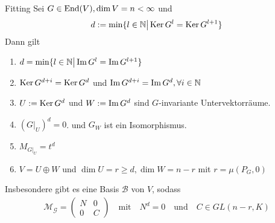 

\begin{lemma}{Fitting}
    Sei $G \in \operatorname{End}(V), \dim V = n < \infty$ und 
    \begin{align*}
        d: = \min\{l \in \mathbb{N} \big\vert \operatorname{Ker} G^l = \operatorname{Ker} G^{l+1}\}
    \end{align*}
    Dann gilt
    \begin{enumerate}
        \item   $d = \min \{l \in \mathbb{N} \big\vert \operatorname{Im} G^l = \operatorname{Im} G^{l+1}\}$
        \item   $\operatorname{Ker} G^{d+i} = \operatorname{Ker} G^d$ und $\operatorname{Im} G^{d+i} = \operatorname{Im} G^d, \forall i \in \mathbb{N}$
        \item   $U := \operatorname{Ker} G^d$ und $W := \operatorname{Im} G^d$ sind $G$-invariante Untervektorräume.
        \item   $(G|_{U})^d = 0$. und $G_W$ ist ein Isomorphismus.
        \item   $M_{G|_{U}} = t^d$
        \item   $V = U \oplus W$ und $\dim U = r \geq d, \dim W = n - r$ mit $r = \mu(P_G,0)$
    \end{enumerate}
    Insbesondere gibt es eine Basis $\mathcal{B}$ von $V$, sodass
    \begin{align*}
        \mathcal{M}_{\mathcal{G}} = \begin{pmatrix}
            N & 0\\
            0 & C
        \end{pmatrix} \quad \text{mit} \quad N^d = 0 \quad \text{und} \quad C \in GL(n-r,K)
    \end{align*}
\end{lemma}


